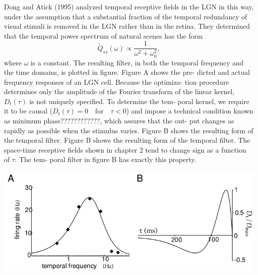 \begin{exm}
  Dong and Atick (1995) analyzed temporal receptive fields in the LGN in
this way, under the assumption that a substantial fraction of the
temporal redundancy of visual stimuli is removed in the LGN rather
than in the retina. They determined that the temporal power spectrum
of natural scenes has the form
\begin{equation}
  \label{equ:4.51}
  \tilde{Q}_{ss}(\omega) \propto \frac{1}{\omega^{2}+\omega_{0}^{2}},
\end{equation}
where $\omega$ is a constant. The resulting filter, in both the temporal frequency
and the time domains, is plotted in figure. Figure A shows the pre-
dicted and actual frequency responses of an LGN cell. Because the optimiza-
tion procedure determines only the amplitude of the Fourier transform of
the linear kernel, $D_t(\tau)$ is not uniquely specified. To determine the tem-
poral kernel, we require it to be causal ($D_t(\tau)=0 \quad\text{for} \quad\tau<0$) and impose a
technical condition known as minimum phase????????????, which assures that the out-
put changes as rapidly as possible when the stimulus varies. Figure B
shows the resulting form of the temporal filter. Figure B
shows the resulting form of the temporal filter. The space-time receptive
fields shown in chapter 2 tend to change sign as a function of $\tau$. The tem-
poral filter in figure B has exactly this property.
\begin{center}
  \label{fig:4-4}
  \includegraphics[scale = 0.35]{./png/4-4}
\end{center}
\end{exm}

